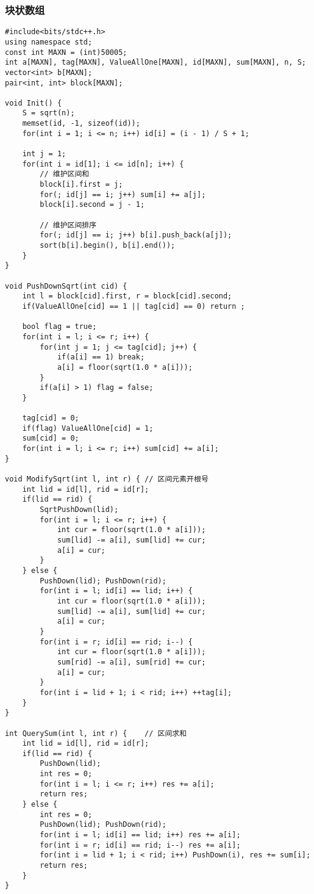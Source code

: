 \subsubsection{块状数组}
\begin{lstlisting}
#include<bits/stdc++.h>
using namespace std;
const int MAXN = (int)50005;
int a[MAXN], tag[MAXN], ValueAllOne[MAXN], id[MAXN], sum[MAXN], n, S;
vector<int> b[MAXN];
pair<int, int> block[MAXN];
 
void Init() {
	S = sqrt(n);
	memset(id, -1, sizeof(id));
	for(int i = 1; i <= n; i++) id[i] = (i - 1) / S + 1;
	
	int j = 1;
	for(int i = id[1]; i <= id[n]; i++) {
		// 维护区间和
		block[i].first = j;
		for(; id[j] == i; j++) sum[i] += a[j];
		block[i].second = j - 1;
		
		// 维护区间排序
		for(; id[j] == i; j++) b[i].push_back(a[j]);
		sort(b[i].begin(), b[i].end());		
	}
}

void PushDownSqrt(int cid) {
	int l = block[cid].first, r = block[cid].second;
	if(ValueAllOne[cid] == 1 || tag[cid] == 0) return ;
	
	bool flag = true;
	for(int i = l; i <= r; i++) {
		for(int j = 1; j <= tag[cid]; j++) {
			if(a[i] == 1) break;
			a[i] = floor(sqrt(1.0 * a[i]));
		}
		if(a[i] > 1) flag = false;
	}
	
	tag[cid] = 0;
	if(flag) ValueAllOne[cid] = 1;
	sum[cid] = 0;
	for(int i = l; i <= r; i++) sum[cid] += a[i];
}

void ModifySqrt(int l, int r) {	// 区间元素开根号
	int lid = id[l], rid = id[r];
	if(lid == rid) {
		SqrtPushDown(lid);
		for(int i = l; i <= r; i++) {
			int cur = floor(sqrt(1.0 * a[i]));
			sum[lid] -= a[i], sum[lid] += cur;
			a[i] = cur;
		}
	} else {
		PushDown(lid); PushDown(rid);
		for(int i = l; id[i] == lid; i++) {
			int cur = floor(sqrt(1.0 * a[i]));
			sum[lid] -= a[i], sum[lid] += cur;
			a[i] = cur;			
		}
		for(int i = r; id[i] == rid; i--) {
			int cur = floor(sqrt(1.0 * a[i]));
			sum[rid] -= a[i], sum[rid] += cur;
			a[i] = cur;	
		}
		for(int i = lid + 1; i < rid; i++) ++tag[i];
	}
}

int QuerySum(int l, int r) {	// 区间求和
	int lid = id[l], rid = id[r];
	if(lid == rid) {
		PushDown(lid);
		int res = 0;
		for(int i = l; i <= r; i++) res += a[i];
		return res;
	} else {
		int res = 0;
		PushDown(lid); PushDown(rid);
		for(int i = l; id[i] == lid; i++) res += a[i];
		for(int i = r; id[i] == rid; i--) res += a[i];
		for(int i = lid + 1; i < rid; i++) PushDown(i), res += sum[i];
		return res;
	}
}


\end{lstlisting}
